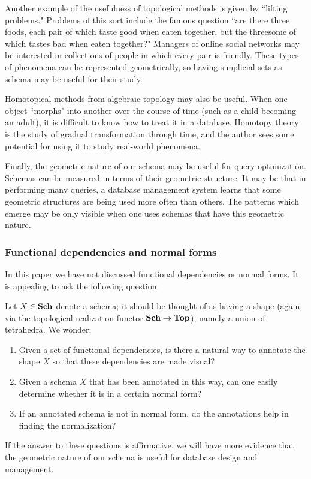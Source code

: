 \documentclass{amsart}
\def\Sch{{\bf Sch}}
\begin{document}
Another example of the usefulness of topological methods is given by ``lifting problems."  Problems of this sort include the famous question ``are there three foods, each pair of which taste good when eaten together, but the threesome of which tastes bad when eaten together?"  Managers of online social networks may be interested in collections of people in which every pair is friendly.  These types of phenomena can be represented geometrically, so having simplicial sets as schema may be useful for their study.

Homotopical methods from algebraic topology may also be useful.  When one object ``morphs" into another over the course of time (such as a child becoming an adult), it is difficult to know how to treat it in a database.  Homotopy theory is the study of gradual transformation through time, and the author sees some potential for using it to study real-world phenomena.

Finally, the geometric nature of our schema may be useful for query optimization.  Schemas can be measured in terms of their geometric structure.  It may be that in performing many queries, a database management system learns that some geometric structures are being used more often than others.  The patterns which emerge may be only visible when one uses schemas that have this geometric nature.

\subsubsection{Functional dependencies and normal forms}

In this paper we have not discussed functional dependencies or normal forms.  It is appealing to ask the following question:

\begin{question}

Let $X\in\Sch$ denote a schema; it should be thought of as having a shape (again, via the topological realization functor $\Sch\to\Top$), namely a union of tetrahedra.  We wonder:

\begin{enumerate}\item Given a set of functional dependencies, is there a natural way to annotate the shape $X$ so that these dependencies are made visual? \item Given a schema $X$ that has been annotated in this way, can one easily determine whether it is in a certain normal form?  \item If an annotated schema is not in normal form, do the annotations help in finding the normalization? \end{enumerate}  If the answer to these questions is affirmative, we will have more evidence that the geometric nature of our schema is useful for database design and management.

\end{question}
\end{document}
